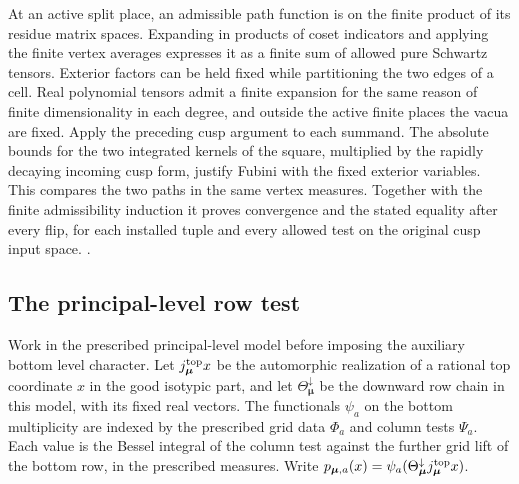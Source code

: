 At an active split place, an admissible path function is on
the finite product of its residue matrix spaces. Expanding in
products of coset indicators and applying the finite vertex
averages expresses it as a finite sum of allowed pure
Schwartz tensors. Exterior factors can be held fixed while
partitioning the two edges of a cell. Real polynomial tensors
admit a finite expansion for the same reason of finite
dimensionality in each degree, and outside the active finite
places the vacua are fixed. Apply the preceding cusp argument
to each summand. The absolute bounds for the two integrated
kernels of the square, multiplied by the rapidly decaying
incoming cusp form, justify Fubini with the fixed exterior
variables. This compares the two paths in the same vertex
measures. Together with the finite admissibility induction
it proves convergence and the stated equality after every
flip, for each installed tuple and every allowed test on the
original cusp input space.
.

\subsection{The principal-level row test}
Work in the prescribed principal-level model before imposing the
auxiliary bottom level character. Let \(j_{\boldsymbol\mu}^{\rm top}x\)
be the automorphic realization of a rational top coordinate \(x\) in
the good isotypic part, and let \(\Theta_{\boldsymbol\mu}^{\downarrow}\)
be the downward row chain in this model, with its fixed real vectors.
The functionals \(\psi_a\) on the bottom multiplicity are indexed by
the prescribed grid data \(\Phi_a\) and column tests \(\Psi_a\).
Each value is the Bessel integral of the column test against the
further grid lift of the bottom row, in the prescribed measures.
Write \(p_{\boldsymbol\mu,a}(x)=
\psi_a(\Theta_{\boldsymbol\mu}^{\downarrow}j_{\boldsymbol\mu}^{\rm top}x)\).

%
